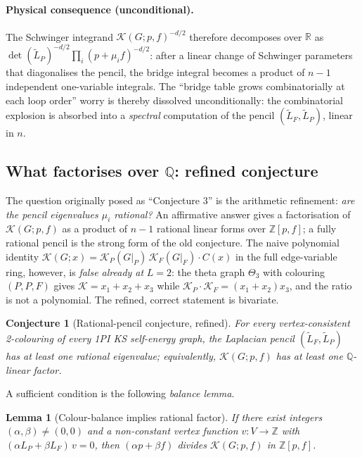 \documentclass[11pt,a4paper]{article}
\theoremstyle{plain}
\newtheorem{conjecture}[theorem]{Conjecture}
\newtheorem{lemma}[theorem]{Lemma}
\begin{document}
\paragraph{Physical consequence (unconditional).}
The Schwinger integrand $\mathcal{K}(G;p,f)^{-d/2}$ therefore
decomposes over $\mathbb{R}$ as
$\det(\widetilde L_P)^{-d/2} \prod_i (p + \mu_i f)^{-d/2}$:
after a linear change of Schwinger parameters that diagonalises
the pencil, the bridge integral becomes a product of $n{-}1$
independent one-variable integrals.  The ``bridge table grows
combinatorially at each loop order'' worry is thereby dissolved
unconditionally: the combinatorial explosion is absorbed into a
\emph{spectral} computation of the pencil $(\widetilde L_F, \widetilde L_P)$,
linear in $n$.

\subsection{What factorises over $\mathbb{Q}$: refined conjecture}

The question originally posed as ``Conjecture 3'' is the
arithmetic refinement: \emph{are the pencil eigenvalues
$\mu_i$ rational?}  An affirmative answer gives a factorisation
of $\mathcal{K}(G;p,f)$ as a product of $n{-}1$ rational linear
forms over $\mathbb{Z}[p,f]$; a fully rational pencil is the
strong form of the old conjecture.  The naive polynomial identity
$\mathcal{K}(G;x) = \mathcal{K}_P(G|_P)\,\mathcal{K}_F(G|_F)\cdot C(x)$
in the full edge-variable ring, however, is \emph{false already
at} $L = 2$: the theta graph $\Theta_3$ with colouring $(P,P,F)$
gives $\mathcal{K} = x_1 + x_2 + x_3$ while $\mathcal{K}_P\cdot
\mathcal{K}_F = (x_1 + x_2)x_3$, and the ratio is not a polynomial.
The refined, correct statement is bivariate.

\begin{conjecture}[Rational-pencil conjecture, refined]
\label{conj:twocolour}
For every vertex-consistent 2-colouring of every 1PI KS
self-energy graph, the Laplacian pencil
$(\widetilde L_F, \widetilde L_P)$ has at least one rational eigenvalue;
equivalently, $\mathcal{K}(G;p,f)$ has at least one
$\mathbb{Q}$-linear factor.
\end{conjecture}

A sufficient condition is the following \emph{balance lemma}.

\begin{lemma}[Colour-balance implies rational factor]
\label{lem:colour-balance}
If there exist integers $(\alpha, \beta) \neq (0,0)$ and a
non-constant vertex function $v : V \to \mathbb{Z}$ with
$(\alpha L_P + \beta L_F)\,v = 0$, then
$(\alpha p + \beta f)$ divides $\mathcal{K}(G;p,f)$ in $\mathbb{Z}[p,f]$.
\end{lemma}
\end{document}
